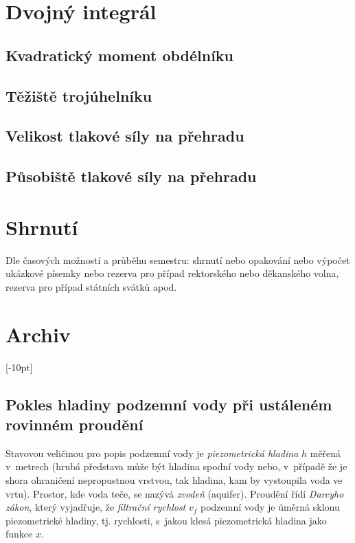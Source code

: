 \stranka
\section{Dvojný integrál}

\subsection{Kvadratický moment obdélníku}

\subsection{Těžiště trojúhelníku}

\subsection{Velikost tlakové síly na přehradu}

\subsection{Působiště tlakové síly na přehradu}

\stranka
\section{Shrnutí}

Dle časových možností a průběhu semestru: shrnutí nebo opakování nebo výpočet ukázkové písemky nebo rezerva pro případ rektorského nebo děkanského volna, rezerva pro případ státních svátků apod.




\stranka


\section{Archiv}

\stranka
{}[-10pt]


\subsection{Pokles hladiny podzemní vody při ustáleném rovinném proudění}

\label{pokles}
Stavovou veličinou pro popis podzemní vody je \textit{piezometrická
  hladina} $h$ měřená v metrech (hrubá představa může být hladina
spodní vody nebo, v případě že je shora ohraničení nepropustnou
vrstvou, tak hladina, kam by vystoupila voda ve vrtu). Prostor, kde
voda teče, se nazývá \textit{zvodeň} (aquifer).
Proudění řídí \textit{Darcyho zákon}, který
  vyjadřuje, že \textit{filtrační rychlost} $v_f$ podzemní vody je úměrná
  sklonu piezometrické hladiny, tj. rychlosti, s jakou klesá
  piezometrická hladina jako funkce $x$.

